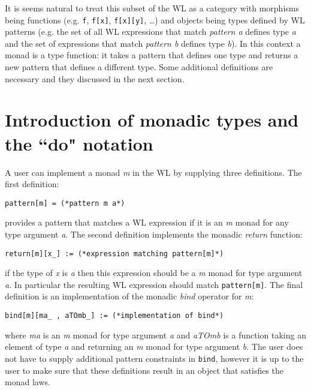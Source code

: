 \documentclass[smallextended]{svjour3}
\begin{document}
It is seems natural to treat this subset of the WL as a category with morphisms
being functions (e.g. \verb|f|, \verb|f[x]|, \verb|f[x][y]|, \ldots) and objects
being types defined by WL patterns (e.g. the set of all WL expressions that match \emph{pattern a} 
defines type \emph{a} and the set of expressions that match \emph{pattern b}
defines type \emph{b}). In this context a monad is a type function: it takes a
pattern that defines one type and returns a new pattern that defines a different
type. Some additional definitions are necessary and they discussed in the next section.

\section{Introduction of monadic types and the ``do" notation}
\label{monadic_types}

A user can implement a monad \emph{m} in the WL by supplying three definitions.
The first definition:
\begin{lstlisting}
pattern[m] = (*pattern m a*)
\end{lstlisting}
provides a pattern that matches a WL expression if it is an \emph{m} monad for any type argument
\emph{a}. The second definition implements the monadic \emph{return} function:
\begin{lstlisting}
return[m][x_] := (*expression matching pattern[m]*)
\end{lstlisting}
if the type of \emph{x} is \emph{a} then this expression should be a
\emph{m} monad for type argument \emph{a}. In particular the resulting
WL expression should match \verb|pattern[m]|. The final definition is 
an implementation of the monadic
\emph{bind} operator for \emph{m}:
\begin{lstlisting}
bind[m][ma_ , aTOmb_] := (*implementation of bind*)
\end{lstlisting}
where \emph{ma} is an \emph{m} monad for type argument \emph{a} and
\emph{aTOmb} is a function taking an element of type \emph{a} and returning an 
\emph{m} monad for type argument \emph{b}. The user does not have
to supply additional pattern constraints in \verb|bind|, however 
it is up to the user to make sure that these definitions result in
an object that satisfies the monad laws.
\end{document}
